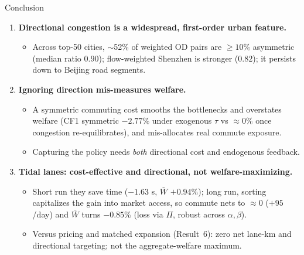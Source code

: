 \documentclass[11pt,aspectratio=169]{beamer}
\newcommand{\good}[1]{\textcolor{blue!70!black}{#1}}
\newcommand{\bad}[1]{\textcolor{red!70!black}{#1}}
\begin{document}
\begin{frame}{Conclusion}
\begin{enumerate}
  \item \textbf{Directional congestion is a widespread, first-order urban feature.}
  \begin{itemize}\footnotesize
    \item Across top-50 cities, \good{$\sim$52\%} of weighted OD pairs are $\geq10\%$ asymmetric (median ratio $0.90$); flow-weighted Shenzhen is stronger ($0.82$); it persists down to Beijing road segments.
  \end{itemize}
  \item \textbf{Ignoring direction mis-measures welfare.}
  \begin{itemize}\footnotesize
    \item A symmetric commuting cost smooths the bottlenecks and \bad{overstates} welfare (CF1 symmetric $-2.77\%$ under exogenous $\tau$ vs $\approx0\%$ once congestion re-equilibrates), and mis-allocates real commute exposure.
    \item Capturing the policy needs \emph{both} directional cost and endogenous feedback.
  \end{itemize}
  \item \textbf{Tidal lanes: cost-effective and directional, not welfare-maximizing.}
  \begin{itemize}\footnotesize
    \item Short run they save time ($-1.63$ s, $\bar W$ $+0.94\%$); long run, sorting capitalizes the gain into market access, so commute nets to $\approx0$ ($+95$/day) and $\bar W$ turns \bad{$-0.85\%$} (loss via $\Pi$, robust across $\alpha,\beta$).
    \item Versus pricing and matched expansion (Result~6): \good{zero net lane-km} and directional targeting; not the aggregate-welfare maximum.
  \end{itemize}
\end{enumerate}
\end{frame}

\appendix
\end{document}
